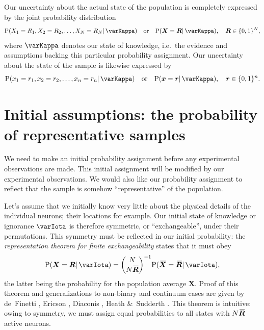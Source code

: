 \documentclass{article}
\theoremstyle{remark}
\theoremstyle{innote}
\newcommand*{\citep}{\parencites}
\renewcommand*{\cite}{\citep}
\newcommand*{\amp}{\&}
\renewcommand*{\|}{\mathpunct{|}}%
\DeclarePairedDelimiter\set{\{}{\}}
\newcommand*{\p}{\mathrm{P}}%
\newcommand*{\ie}{{i.e.}}
\theoremstyle{simple}
\newcommand*{\widebar}[1]{{\mkern1.5mu\skew{2}\overline{\mkern-1.5mu#1\mkern-1.5mu}\mkern 1.5mu}}
\newcommand*{\av}{\widebar} %
\newcommand*{\yxx}{x}%
\newcommand*{\yx}{\bm{\yxx}}%
\newcommand*{\yX}{\bm{X}}%
\newcommand*{\yXf}{\av{\yX}}%
\newcommand*{\yr}{\bm{r}}%
\newcommand*{\yR}{\bm{R}}%
\newcommand*{\yRf}{\av{\yR}}%
\newcommand*{\yH}{\varIota}
\newcommand*{\yHc}{\varKappa}
\begin{document}
Our uncertainty about the actual state of the population is completely
expressed by the joint probability distribution
\begin{equation}
  \label{eq:joint_plaus}
  \p(X_1=R_1, X_2=R_2, \dotsc, X_N=R_N \| \yHc) \quad\text{or}\quad
\p(\yX =\yR \| \yHc), \quad \yR \in \set{0,1}^N,
\end{equation}
where $\yHc$ denotes our state of knowledge, \ie\ the evidence and
assumptions backing this particular probability assignment. Our uncertainty
about the state of the sample is likewise expressed by
\begin{equation}
  \label{eq:sample_plaus}
  \p(x_1=r_1, x_2=r_2, \dotsc, x_n=r_n \| \yHc) \quad\text{or}\quad
\p(\yx =\yr \| \yHc), \quad \yr \in \set{0,1}^n.
\end{equation}



\section{Initial assumptions: the probability of representative samples}
\label{sec:prob_samples}

We need to make an initial probability assignment before any experimental
observations are
made. %
This initial assignment will be modified by our experimental observations.
We would also like our probability assignment to reflect that the sample is
somehow \enquote{representative} of the population.

Let's assume that we initially know very little about the physical details
of the individual neurons; their locations for example. Our initial state
of knowledge or ignorance $\yH$ is therefore symmetric, or
\enquote{exchangeable}, under their permutations. This symmetry must be
reflected in our initial probability: the \emph{representation theorem for
  finite exchangeability} states that it must obey
\begin{equation}
  \label{eq:joint_plaus_N_homog}
  \p(\yX = \yR \| \yH) = \binom{N}{N\yRf}^{-1} \p(\yXf=\yRf \| \yH),
\end{equation}
the latter being the probability for the population average $\yX$. Proof of
this theorem and generalizations to non-binary and continuum cases are
given by de~Finetti \cite{definetti1959b}, Ericson \cite{ericson1976},
Diaconis \cite{diaconis1977}, Heath \amp\ Sudderth \cite{heathetal1976}.
This theorem is intuitive: owing to symmetry, we must assign equal
probabilities to all states with $N\yRf$ active neurons.
\end{document}
